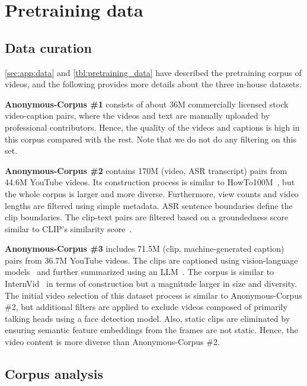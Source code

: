 \documentclass{article}
\theoremstyle{plain}
\theoremstyle{definition}
\theoremstyle{remark}
\begin{document}
%
 






\clearpage
\appendix
\section{Pretraining data}
\label{app:data}

\subsection{Data curation}
\label{app:data:curation}
\cref{sec:app:data} and \cref{tbl:pretraining_data} have described the pretraining corpus of videos, and the following provides more details about the three in-house datasets.

\textbf{Anonymous-Corpus \#1} consists of about 36M commercially licensed stock video-caption pairs, where the videos and text are manually uploaded by professional contributors. Hence, the quality of the videos and captions is high in this corpus compared with the rest. Note that we do not do any filtering on this set.

\textbf{Anonymous-Corpus \#2} contains 170M (video, ASR transcript) pairs from 44.6M YouTube videos. Its construction process is similar to HowTo100M~\cite{miech2019howto100m}, but the whole corpus is larger and more diverse. Furthermore, view counts and video lengths are filtered using simple metadata. ASR sentence boundaries define the clip boundaries. The clip-text pairs are filtered based on a groundedness score similar to CLIP's similarity score~\cite{wu2021godiva}.

\textbf{Anonymous-Corpus \#3} includes 71.5M (clip, machine-generated caption) pairs from 36.7M YouTube videos. The clips are captioned using vision-language models~\cite{chen2023pali} and further summarized using an LLM~\cite{anil2023palm}. The corpus is similar to InternVid~\cite{wang2023internvid} in terms of construction but a magnitude larger in size and diversity. The initial video selection of this dataset process is similar to Anonymous-Corpus \#2, but additional filters are applied to exclude videos composed of primarily talking heads using a face detection model. Also, static clips are eliminated by ensuring semantic feature embeddings from the frames are not static. Hence, the video content is more diverse than Anonymous-Corpus \#2.

\subsection{Corpus analysis}
\end{document}
